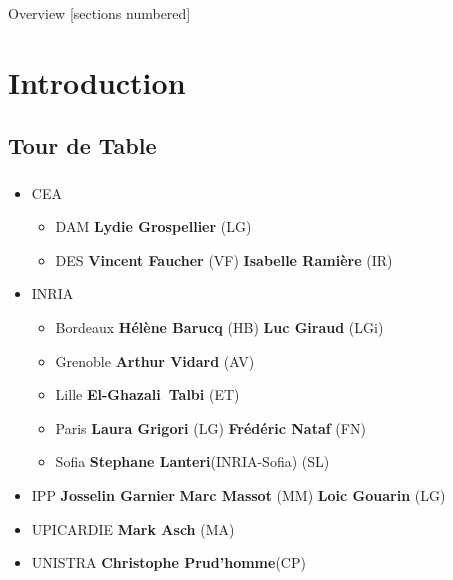 \titleframe

\begin{frame}{Overview}
  [sections numbered]
  \tableofcontents[hideallsubsections]
\end{frame}


\section{Introduction}
\subsection{Tour de Table}
\begin{frame}
  \frametitle{\insertsectionhead}
  \framesubtitle{\insertsubsectionhead}

  \begin{itemize}
    \item CEA 
    \begin{itemize}
      \item DAM \textbf{Lydie Grospellier} (LG)
      \item DES \textbf{Vincent Faucher} (VF) \textbf{Isabelle Ramière} (IR)  
    \end{itemize}
    \item INRIA 
    \begin{itemize}
      \item Bordeaux \textbf{Hélène Barucq} (HB) \textbf{Luc Giraud} (LGi)
      \item  Grenoble \textbf{Arthur Vidard} (AV)
      \item Lille \textbf{El-Ghazali Talbi} (ET)
      \item Paris \textbf{Laura Grigori} (LG) \textbf{Frédéric Nataf} (FN)
      \item Sofia \textbf{Stephane Lanteri}(INRIA-Sofia) (SL) 
    \end{itemize}
    \item IPP \textbf{Josselin Garnier} \textbf{Marc Massot} (MM) \textbf{Loic Gouarin} (LG)
    \item UPICARDIE \textbf{Mark Asch} (MA)
    \item UNISTRA \textbf{Christophe Prud'homme}(CP) 
  \end{itemize}
\end{frame}
